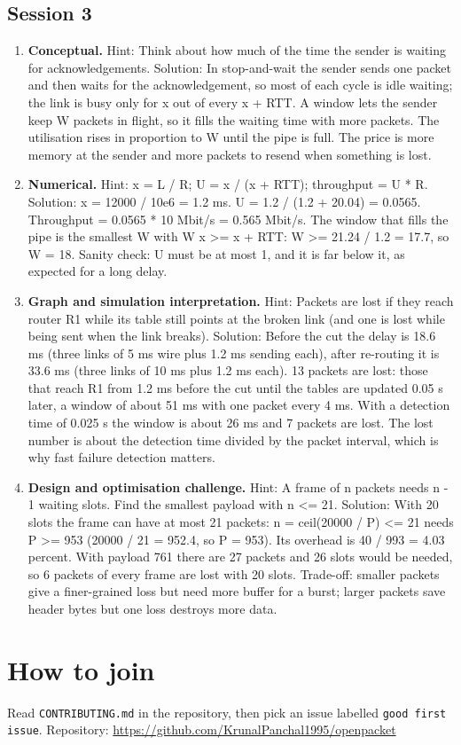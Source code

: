 \documentclass[11pt,a4paper]{article}
\begin{document}
\subsection*{Session 3}
\begin{enumerate}[nosep]
\item \textbf{Conceptual.} Hint: Think about how much of the time the sender is waiting for acknowledgements. Solution: In stop-and-wait the sender sends one packet and then waits for the acknowledgement, so most of each cycle is idle waiting; the link is busy only for x out of every x + RTT. A window lets the sender keep W packets in flight, so it fills the waiting time with more packets. The utilisation rises in proportion to W until the pipe is full. The price is more memory at the sender and more packets to resend when something is lost.
\item \textbf{Numerical.} Hint: x = L / R; U = x / (x + RTT); throughput = U * R. Solution: x = 12000 / 10e6 = 1.2 ms. U = 1.2 / (1.2 + 20.04) = 0.0565. Throughput = 0.0565 * 10 Mbit/s = 0.565 Mbit/s. The window that fills the pipe is the smallest W with W x \textgreater{}= x + RTT: W \textgreater{}= 21.24 / 1.2 = 17.7, so W = 18. Sanity check: U must be at most 1, and it is far below it, as expected for a long delay.
\item \textbf{Graph and simulation interpretation.} Hint: Packets are lost if they reach router R1 while its table still points at the broken link (and one is lost while being sent when the link breaks). Solution: Before the cut the delay is 18.6 ms (three links of 5 ms wire plus 1.2 ms sending each), after re-routing it is 33.6 ms (three links of 10 ms plus 1.2 ms each). 13 packets are lost: those that reach R1 from 1.2 ms before the cut until the tables are updated 0.05 s later, a window of about 51 ms with one packet every 4 ms. With a detection time of 0.025 s the window is about 26 ms and 7 packets are lost. The lost number is about the detection time divided by the packet interval, which is why fast failure detection matters.
\item \textbf{Design and optimisation challenge.} Hint: A frame of n packets needs n - 1 waiting slots. Find the smallest payload with n \textless{}= 21. Solution: With 20 slots the frame can have at most 21 packets: n = ceil(20000 / P) \textless{}= 21 needs P \textgreater{}= 953 (20000 / 21 = 952.4, so P = 953). Its overhead is 40 / 993 = 4.03 percent. With payload 761 there are 27 packets and 26 slots would be needed, so 6 packets of every frame are lost with 20 slots. Trade-off: smaller packets give a finer-grained loss but need more buffer for a burst; larger packets save header bytes but one loss destroys more data.
\end{enumerate}

\section{How to join}
Read \texttt{CONTRIBUTING.md} in the repository, then pick an issue labelled \texttt{good first issue}. Repository: \url{https://github.com/KrunalPanchal1995/openpacket}
\end{document}
